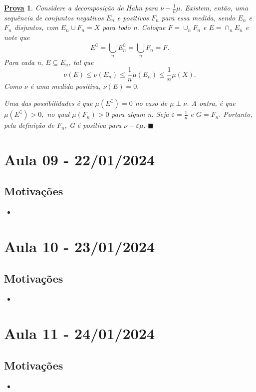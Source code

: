 \documentclass{article}
\newtheorem*{proof*}{\underline{Prova}}
\renewcommand\qedsymbol{$\blacksquare$}
\begin{document}
\begin{proof*}
  Considere a decomposição de Hahn para \(\nu -\frac{1}{n}\mu .\) Existem, então, uma sequência de conjuntos negativos \(E_{n}\) e positivos \(F_{n}\) para essa medida, sendo \(E_{n}\) e \(F_{n}\) disjuntos, com \(E_{n}\cup F_{n} = X\) para todo n. 
Coloque \(F = \cup _n F_{n}\) e \(E = \cap_{n} E_{n}\) e note que 
  \[
    E ^{\complement} = \bigcup_{n}^{}E_{n}^{\complement} = \bigcup_{n}^{}F_{n} = F.
  \]
Para cada n, \(E\subseteq E_{n}\), tal que 
  \[
    \nu (E) \leq \nu (E_{n}) \leq \frac{1}{n}\mu (E_{n})\leq \frac{1}{n}\mu (X).
  \]
Como \(\nu \) é uma medida positiva, \(\nu (E) = 0.\) 

Uma das possibilidades é que \(\mu (E ^{\complement}) = 0\) no caso de \(\mu \perp \nu \). A outra, é que \(\mu (E ^{\complement})>0,\) no qual \(\mu (F_{n}) > 0\) para algum n. Seja \(\varepsilon  = \frac{1}{n}\) e \(G = F_{n}.\) Portanto, 
pela definição de \(F_{n}\), G é positiva para \(\nu - \varepsilon \mu .\) \qedsymbol
\end{proof*}
   
\newpage
\section{Aula 09 - 22/01/2024}
\subsection{Motivações}
\begin{itemize}
	\item
\end{itemize}
\newpage
\section{Aula 10 - 23/01/2024}
\subsection{Motivações}
\begin{itemize}
	\item
\end{itemize}
\newpage
\section{Aula 11 - 24/01/2024}
\subsection{Motivações}
\begin{itemize}
	\item
\end{itemize}
\newpage
\end{document}
